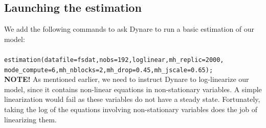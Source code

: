\subsection{Launching the estimation}
We add the following commands to ask Dynare to run a basic estimation of our model:\\
\\
\texttt{estimation(datafile=fsdat,nobs=192,loglinear,mh\_replic=2000,\\
mode\_compute=6,mh\_nblocks=2,mh\_drop=0.45,mh\_jscale=0.65);}\\

\textsf{\textbf{NOTE!}} As mentioned earlier, we need to instruct Dynare to log-linearize our model, since it contains non-linear equations in non-stationary variables. A simple linearization would fail as these variables do not have a steady state. Fortunately, taking the log of the equations involving non-stationary variables does the job of linearizing them.\\

